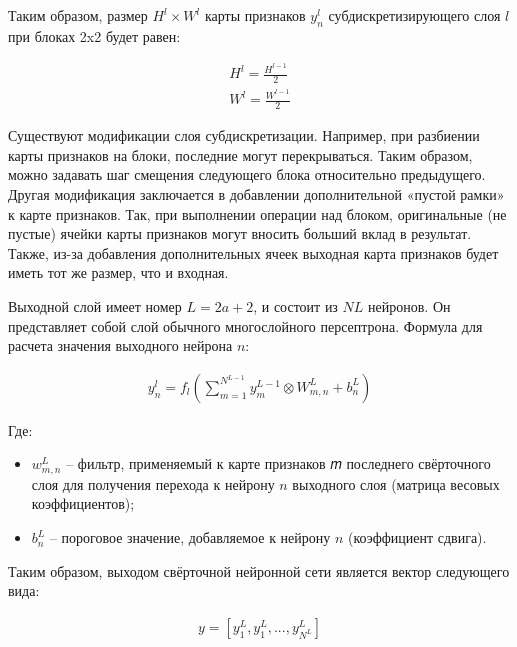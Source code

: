 \begin{itemize}
\begin{itemize}
Таким образом, размер $H^l \times W^l$ карты признаков $y_n^l$ субдискретизирующего слоя $l$ при блоках 2x2 будет равен:

\begin{equation}
  \begin{gathered}
    H^l = \frac {H^{l-1}} {2} \\
    W^l = \frac {W^{l-1}} {2}
  \end{gathered}
  \label{eq:speach_formula_10}
\end{equation}

Существуют модификации слоя субдискретизации. Например, при разбиении карты признаков на блоки, последние могут перекрываться. 
Таким образом, можно задавать шаг смещения следующего блока относительно предыдущего. 
Другая модификация заключается в добавлении дополнительной «пустой рамки» к карте признаков. 
Так, при выполнении операции над блоком, оригинальные (не пустые) ячейки карты признаков могут вносить больший вклад в результат. 
Также, из-за добавления дополнительных ячеек выходная карта признаков будет иметь тот же размер, что и входная.

Выходной слой имеет номер $L=2a+2$, и состоит из $NL$ нейронов. 
Он представляет собой слой обычного многослойного персептрона. Формула для расчета значения выходного нейрона $n$:

\begin{equation}
  \begin{gathered}
    y_n^l = f_l (\sum_{m=1}^{N^{L-1}} y_m^{L-1} \otimes W_{m,n}^L + b_n^L)
  \end{gathered}
  \label{eq:speach_formula_11}
\end{equation}

Где:
\begin{itemize}
  \item $w_{m,n}^L$ – фильтр, применяемый к карте признаков 𝑚 последнего свёрточного слоя для получения перехода к нейрону $n$ выходного слоя (матрица весовых коэффициентов);
  \item $b_n^L$ – пороговое значение, добавляемое к нейрону $n$ (коэффициент сдвига).
\end{itemize}

Таким образом, выходом свёрточной нейронной сети является вектор следующего вида:

\begin{equation}
  \begin{gathered}
    y = \left[ y_1^L,y_1^L, ...,  y_{N^L}^L\right]
  \end{gathered}
  \label{eq:speach_formula_12}
\end{equation}


\end{itemize}
\end{itemize}

